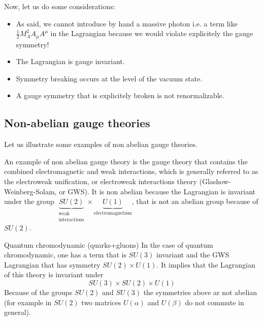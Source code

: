 \documentclass[../../Main/Main.tex]{subfiles}
\begin{document}
Now, let us do some considerations:

\begin{itemize}
\item As said, we cannot introduce by hand a massive photon i.e. a term like \( \frac{1}{2} M_A^2 A_ \mu A ^\mu  \) in the Lagrangian because we would violate explicitely the gauge symmetry!
\item The Lagrangian is gauge invariant.
\item Symmetry breaking occurs at the level of the vacuum state.
\item A gauge symmetry that is explicitely broken is not renormalizable.
\end{itemize}





\subsection{Non-abelian gauge theories}
Let us illustrate some examples of non abelian gauge theories.

\begin{example}{}{}
An example of non abelian gauge theory is the gauge theory that contains the combined electromagnetic and weak interactions, which is generally referred to as the electroweak unification, or electroweak interactions theory (Glashow-Weinberg-Solam, or GWS). It is non abelian because the Lagrangian is invariant under the group \( \underbrace{S U (2)}_{\substack{ \text{weak} \\  \text{interactions} } }  \times \underbrace{U(1)}_{\text{electromagnetism}}  \), that is not an abelian group because of \( S U(2) \).
\end{example}

\begin{example}{Quantum chromodynamic (quarks+gluons)}{}
In the case of quantum chromodynamic, one has a term that is \( SU(3) \) invariant and the GWS Lagrangian that has symmetry \( SU(2) \times U(1) \). It implies that the Lagrangian of this theory is invariant under
  \begin{equation}
    SU(3) \times SU(2) \times U(1)
  \end{equation}
Because of the groups \( SU(2) \) and \( SU(3) \) the symmetries above ar not abelian (for example in \( SU(2) \) two matrices \( U (\alpha ) \) and \( U(\beta ) \) do not commute in general).
\end{example}
\end{document}
